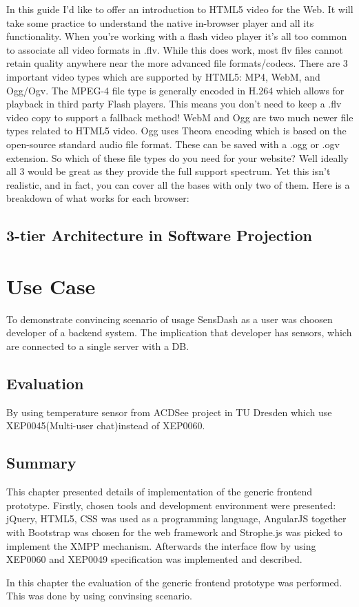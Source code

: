 	In this guide I’d like to offer an introduction to HTML5 video for the Web. It will take some practice to understand the native in-browser player and all its functionality. When you’re working with a flash video player it’s all too common to associate all video formats in .flv. While this does work, most flv files cannot retain quality anywhere near the more advanced file formats/codecs. There are 3 important video types which are supported by HTML5: MP4, WebM, and Ogg/Ogv. The MPEG-4 file type is generally encoded in H.264 which allows for playback in third party Flash players. This means you don’t need to keep a .flv video copy to support a fallback method! WebM and Ogg are two much newer file types related to HTML5 video. Ogg uses Theora encoding which is based on the open-source standard audio file format. These can be saved with a .ogg or .ogv extension.
	So which of these file types do you need for your website? Well ideally all 3 would be great as they provide the full support spectrum. Yet this isn’t realistic, and in fact, you can cover all the bases with only two of them. Here is a breakdown of what works for each browser:

\subsection{3-tier Architecture in Software Projection}
\section{Use Case}
To demonstrate convincing scenario of usage SensDash as a user was choosen developer of a backend system. The implication that developer has sensors, which are connected to a single server with a DB.

 \subsection{Evaluation}
 By using temperature sensor from ACDSee project in TU Dresden which use XEP0045(Multi-user chat)instead of XEP0060.

\subsection{Summary}
This chapter presented details of implementation of the generic frontend prototype. Firstly, chosen tools and development environment were presented: jQuery, HTML5, CSS was used as a programming language, AngularJS together with Bootstrap was chosen for the web framework and Strophe.js was picked to implement the XMPP mechanism. Afterwards the interface flow by using XEP0060 and XEP0049 specification was implemented and described.

In this chapter the evaluation of the generic frontend prototype was performed. This was done by using convinsing scenario. 